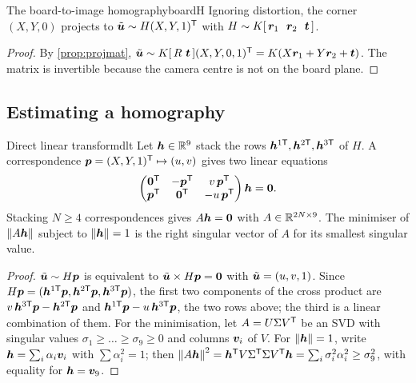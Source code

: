\begin{lemma}{The board-to-image homography}{boardH}
Ignoring distortion, the corner $(X,Y,0)$ projects to
$\tilde{\bm{u}}\sim H(X,Y,1)^{\mathsf{T}}$ with
$H\sim K[\,\vect{r}_1\ \ \vect{r}_2\ \ \vect{t}\,]$.
\end{lemma}

\begin{proof}
By \cref{prop:projmat}, $\tilde{\bm{u}}\sim K[\,R\ \bm{t}\,](X,Y,0,
1)^{\mathsf{T}}=K(X\bm{r}_1+Y\bm{r}_2+\bm{t})$. The matrix is invertible
because the camera centre is not on the board plane.
\end{proof}

\subsection{Estimating a homography}

\begin{proposition}{Direct linear transform}{dlt}
Let $\bm{h}\in\mathbb{R}^9$ stack the rows $\bm{h}^{1\mathsf T},
\bm{h}^{2\mathsf T},\bm{h}^{3\mathsf T}$ of $H$. A correspondence
$\bm{p}=(X,Y,1)^{\mathsf{T}}\mapsto(u,v)$ gives two linear equations
\[
\begin{pmatrix}\bm{0}^{\mathsf{T}}&-\bm{p}^{\mathsf{T}}&v\,\bm{p}^{\mathsf{T}}\\
\bm{p}^{\mathsf{T}}&\bm{0}^{\mathsf{T}}&-u\,\bm{p}^{\mathsf{T}}\end{pmatrix}\bm{h}=\bm{0} .
\]
Stacking $N\ge4$ correspondences gives $A\bm{h}=\bm{0}$ with
$A\in\mathbb{R}^{2N\times9}$. The minimiser of $\left\lVert A\bm{h}\right\rVert$ subject to
$\left\lVert \bm{h}\right\rVert=1$ is the right singular vector of $A$ for its smallest
singular value.
\end{proposition}

\begin{proof}
$\tilde{\bm{u}}\sim H\bm{p}$ is equivalent to
$\tilde{\bm{u}}\times H\bm{p}=\bm{0}$ with $\tilde{\bm{u}}=
(u,v,1)$. Since $H\bm{p}=(\bm{h}^{1\mathsf T}\bm{p},
\bm{h}^{2\mathsf T}\bm{p},\bm{h}^{3\mathsf T}\bm{p})$, the first
two components of the cross product are
$v\,\bm{h}^{3\mathsf T}\bm{p}-\bm{h}^{2\mathsf T}\bm{p}$ and
$\bm{h}^{1\mathsf T}\bm{p}-u\,\bm{h}^{3\mathsf T}\bm{p}$, the
two rows above; the third is a linear combination of them. For the
minimisation, let $A=U\Sigma V^{\mathsf{T}}$ be an SVD with singular values
$\sigma_1\ge\dots\ge\sigma_9\ge0$ and columns $\bm{v}_i$ of $V$. For
$\left\lVert \bm{h}\right\rVert=1$, write $\bm{h}=\sum_i\alpha_i\bm{v}_i$ with
$\sum\alpha_i^2=1$; then $\left\lVert A\bm{h}\right\rVert^2=\bm{h}^{\mathsf{T}} V\Sigma^{\mathsf{T}}\Sigma
V^{\mathsf{T}}\bm{h}=\sum_i\sigma_i^2\alpha_i^2\ge\sigma_9^2$, with equality for
$\bm{h}=\bm{v}_9$.
\end{proof}

